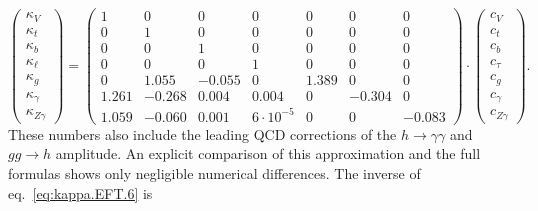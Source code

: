 \begin{equation}
  \label{eq:kappa.EFT.6}
  \begin{pmatrix}
    \kappa_{V}\\
    \kappa_{t}\\
    \kappa_{b}\\
    \kappa_{\ell}\\
    \kappa_{g}\\
    \kappa_{\gamma}\\
    \kappa_{Z\gamma}
  \end{pmatrix}
  = 
  \begin{pmatrix}
    1 & 0 & 0 & 0 & 0 & 0 & 0\\
    0 & 1 & 0 & 0 & 0 & 0 & 0\\
    0 & 0 & 1 & 0 & 0 & 0 & 0\\
    0 & 0 & 0 & 1 & 0 & 0 & 0\\
    0 & 1.055 & -0.055 & 0 & 1.389 & 0 & 0\\
    1.261 & -0.268 & 0.004 & 0.004 & 0 & -0.304 & 0\\
    1.059 & -0.060 & 0.001 & 6 \cdot 10^{-5} & 0 & 0 & -0.083
  \end{pmatrix}
  \cdot
  \begin{pmatrix}
    c_{V}\\
    c_{t}\\
    c_{b}\\
    c_{\tau}\\
    c_{g}\\
    c_{\gamma}\\
    c_{Z\gamma}
  \end{pmatrix}.
\end{equation}
%
These numbers also include the leading QCD corrections of the $h\to \gamma\gamma$ and $gg\to h$ amplitude. An explicit comparison of this approximation and the full formulas shows only negligible numerical differences. The inverse of eq.~\eqref{eq:kappa.EFT.6} is
